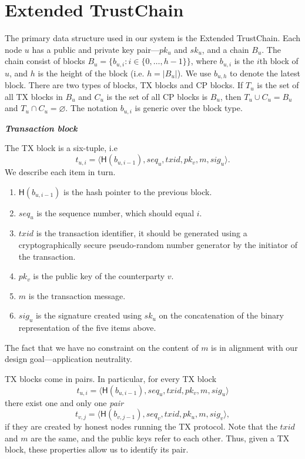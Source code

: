 \section{Extended TrustChain}
The primary data structure used in our system is the Extended TrustChain.
Each node $u$ has a public and private key pair---$pk_u$ and $sk_u$, and a chain $B_u$.
The chain consist of blocks $B_u = \{ b_{u, i} : i \in \{ 0, \dots, h - 1 \} \}$,
where $b_{u, i}$ is the $i$th block of $u$,
and $h$ is the height of the block (i.e. $h = |B_u|$).
We use $b_{u, h}$ to denote the latest block.
There are two types of blocks, TX blocks and CP blocks.
If $T_u$ is the set of all TX blocks in $B_u$ and $C_u$ is the set of all CP blocks is $B_u$,
then $T_u \cup C_u = B_u$ and $T_u \cap C_u = \varnothing$.
The notation $b_{u, i}$ is generic over the block type.

\begin{definition}
\textbf{\emph{Transaction block}}

The TX block is a six-tuple, i.e
$$t_{u, i} = \langle \textsf{H}(b_{u, i - 1}), seq_u, txid, pk_v, m, sig_u \rangle.$$
We describe each item in turn.
\begin{enumerate}
\item $\textsf{H}(b_{u, i - 1})$ is the hash pointer to the previous block.
\item $seq_u$ is the sequence number, which should equal $i$.
\item $txid$ is the transaction identifier, it should be generated using a cryptographically secure pseudo-random number generator by the initiator of the transaction.
\item $pk_v$ is the public key of the counterparty $v$.
\item $m$ is the transaction message.
\item $sig_u$ is the signature created using $sk_u$ on the concatenation of the binary representation of the five items above.
\end{enumerate}
The fact that we have no constraint on the content of $m$ is in alignment with our design goal---application neutrality.

TX blocks come in pairs.
In particular, for every TX block 
$$t_{u, i} = \langle \textsf{H}(b_{u, i - 1}), seq_u, txid, pk_v, m, sig_u \rangle$$
there exist one and only one \emph{pair} 
$$t_{v, j} = \langle \textsf{H}(b_{v, j - 1}), seq_v, txid, pk_u, m, sig_v \rangle,$$
if they are created by honest nodes running the TX protocol.
Note that the $txid$ and $m$ are the same, and the public keys refer to each other.
Thus, given a TX block, these properties allow us to identify its pair.
\end{definition}


